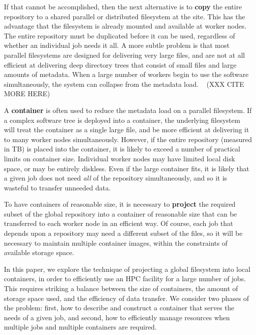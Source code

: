 \documentclass[sigconf]{acmart}
\begin{document}
If that cannot be accomplished, then the next
alternative is to {\bf copy} the entire repository to
a shared parallel or distributed filesystem at the site.
This has the advantage that the filesystem is already
mounted and available at worker nodes.  The entire
repository must be duplicated before it can be used,
regardless of whether an individual job needs it all.
A more subtle problem is that most parallel filesystems are
designed for delivering very large files, and are not at all 
efficient at delivering deep directory trees that
consist of small files and large amounts of metadata.
When a large number of workers begin to use the software
simultaneously, the system can collapse from the metadata
load.  ~\cite{metafs-pdsw-2017}  (XXX CITE MORE HERE)

A {\bf container} is often used to reduce the metadata load
on a parallel filesystem.  If a complex software tree is
deployed into a container, the underlying filesystem will
treat the container as a single large file, and be more
efficient at delivering it to many worker nodes simultaneously.
However, if the entire repository (measured in TB) is placed into
the container, it is likely to exceed a number of practical
limits on container size.  Individual worker nodes may have limited
local disk space, or may be entirely diskless.  Even if the
large container fits, it is likely that a given job does not need
\emph{all} of the repository simultaneously, and so it is wasteful
to transfer unneeded data.

To have containers of reasonable size, it is necessary to {\bf project}
the required subset of the global repository into a container of reasonable size that can be transferred to each worker node in an
efficient way. Of course, each job that depends upon a repository may need a different subset of the files, so it will be necessary to
maintain multiple container images, within the constraints of available 
storage space.

In this paper, we explore the technique of projecting a global
filesystem into local containers, in order to efficiently use
an HPC facility for a large number of jobs.  This requires striking
a balance between the size of containers, the amount of storage
space used, and the efficiency of data transfer.
We consider two phases of the problem: first, how to describe
and construct a container that serves the needs of a given job,
and second, how to efficiently manage resources when multiple
jobs and multiple containers are required.
\end{document}
